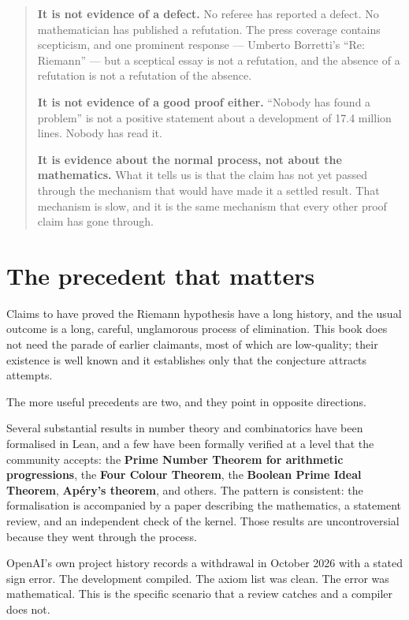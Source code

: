 \begin{quote}
\textbf{It is not evidence of a defect.} No referee has reported a defect. No
mathematician has published a refutation. The press coverage contains
scepticism, and one prominent response --- Umberto Borretti's ``Re: Riemann''
--- but a sceptical essay is not a refutation, and the absence of a refutation
is not a refutation of the absence.

\textbf{It is not evidence of a good proof either.} ``Nobody has found a
problem'' is not a positive statement about a development of 17.4 million
lines. Nobody has read it.

\textbf{It is evidence about the normal process, not about the mathematics.}
What it tells us is that the claim has not yet passed through the mechanism
that would have made it a settled result. That mechanism is slow, and it is
the same mechanism that every other proof claim has gone through.
\end{quote}

\section{The precedent that matters}Claims to have proved the Riemann hypothesis have a long history, and the
usual outcome is a long, careful, unglamorous process of elimination. This
book does not need the parade of earlier claimants, most of which are
low-quality; their existence is well known and it establishes only that the
conjecture attracts attempts.

The more useful precedents are two, and they point in opposite directions.

\begin{description}[style=nextline,leftmargin=0pt,labelwidth=0pt,labelsep=0pt,font=\sffamily\bfseries\small,
  itemsep=5pt]
\item[The successful formalisations.] Several substantial results in number
theory and combinatorics have been formalised in Lean, and a few have been
formally verified at a level that the community accepts: the
\textbf{Prime Number Theorem for arithmetic progressions}, the
\textbf{Four Colour Theorem}, the \textbf{Boolean Prime Ideal Theorem},
\textbf{Apéry's theorem}, and others. The pattern is consistent: the
formalisation is accompanied by a paper describing the mathematics, a
statement review, and an independent check of the kernel. Those results are
uncontroversial because they went through the process.

\item[The withdrawal.] OpenAI's own project history records a withdrawal in
October 2026 with a stated sign error. The development compiled. The axiom
list was clean. The error was mathematical. This is the specific scenario
that a review catches and a compiler does not.
\end{description}

